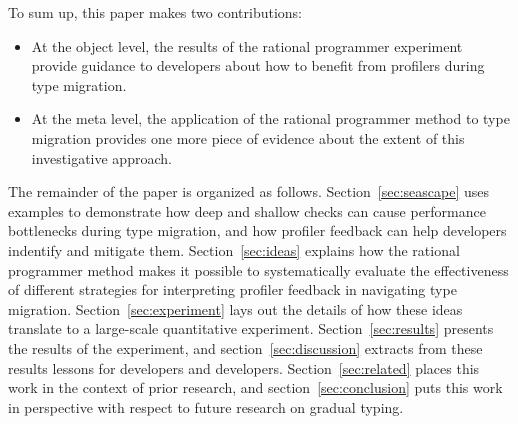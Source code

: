 To sum up, this paper makes two contributions:

\begin{itemize}
  \item At the object level, the results of the rational programmer
    experiment provide guidance to developers about how to benefit from profilers
    during type migration.  
  \item At the meta level, the application of the rational programmer
    method to type migration provides one more piece of evidence 
    about the extent of this investigative approach. 
\end{itemize}    

The remainder of the paper is organized as follows.
Section~\ref{sec:seascape} uses examples to demonstrate how deep
and shallow checks can cause performance bottlenecks during type migration, and how 
profiler feedback
can help developers indentify and mitigate them.  
Section~\ref{sec:ideas} explains how the rational programmer method 
makes it possible to systematically evaluate  the effectiveness of
different strategies for interpreting profiler feedback in 
navigating type migration. Section~\ref{sec:experiment} lays out the
details of how these
ideas translate to a large-scale quantitative experiment. 
Section~\ref{sec:results} presents the results of the experiment, and 
section~\ref{sec:discussion} extracts from these results lessons for
 developers and developers. 
Section~\ref{sec:related} places this work in the context of prior
research, and section~\ref{sec:conclusion} puts this work in perspective
with respect to future research on gradual typing. 
